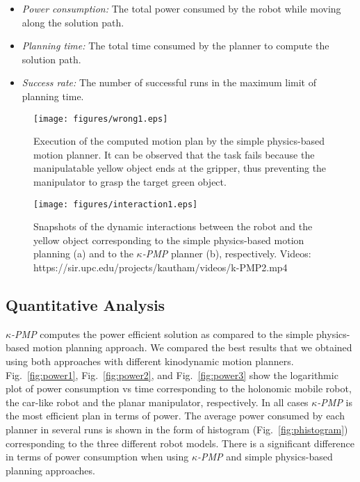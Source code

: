 \documentclass[twocolumn]{svjour3}          %
\begin{document}
\begin{itemize}
\item \textit{Power consumption:} The total power consumed by the robot while moving along the solution path.
\item \textit{Planning time:} The total time consumed by the planner to compute the solution path.
\item \textit{Success rate:} The number of successful runs in the maximum limit of planning time.
\end{itemize}
\begin{figure}[h]
\begin{center}
   \texttt{[image: figures/wrong1.eps]}
   \caption{Execution of the computed motion plan by the simple physics-based motion planner. It can be observed that the task fails because the manipulatable yellow object ends at the gripper, thus 
preventing the manipulator to grasp the target green object.}\label{fig:wrong}
\end{center}
\end{figure}
\begin{figure}[h]
\begin{center}
   \texttt{[image: figures/interaction1.eps]}
   \caption{ Snapshots of the dynamic interactions between the robot and the yellow object corresponding to the  simple physics-based motion planning (a) and to 
the \textit{$\kappa$-PMP} planner (b), respectively. Videos: https://sir.upc.edu/projects/kautham/videos/k-PMP2.mp4}\label{fig:push}
\end{center}
\end{figure}
\subsection{Quantitative Analysis}
\textit{$\kappa$-PMP} computes the power efficient solution as compared to the simple physics-based motion planning approach. We compared the best results that we obtained using both approaches with 
different kinodynamic motion planners. Fig.~\ref{fig:power1}, Fig.~\ref{fig:power2}, and Fig.~\ref{fig:power3} show the logarithmic plot of power consumption vs time corresponding to the holonomic 
mobile robot, the car-like robot and the planar manipulator, respectively. In all cases \textit{$\kappa$-PMP} is the most efficient plan in terms of power.
The average power consumed by each planner in several runs is shown in the form of histogram (Fig.~\ref{fig:phistogram}) corresponding to the three different robot models. There is a significant 
difference in terms of power consumption when using \textit{$\kappa$-PMP} and simple physics-based planning approaches. 
\end{document}

